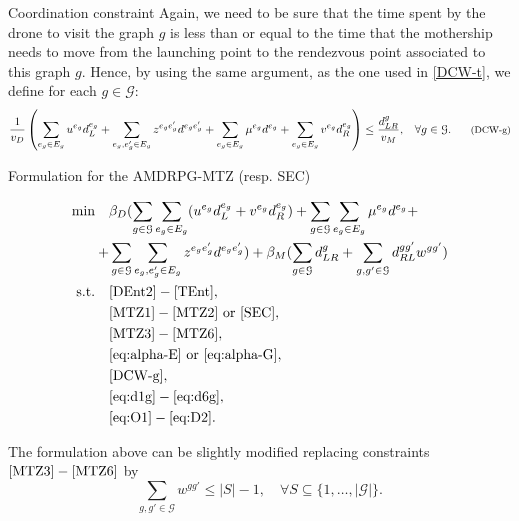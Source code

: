 \documentclass[slidestop,usepdftitle=false,10pt]{beamer}
\begin{document}
	\begin{frame}{Coordination constraint}
	    Again, we need to be sure that the time spent by the drone to visit the graph $g$ is less than or equal to the time that the mothership needs to move from the launching point to the rendezvous point associated to this graph $g$. Hence, by using the same argument, as the one used in \eqref{DCW-t}, we define for each $g\in \mathcal G$:
        \begin{equation}
        \footnotesize
         \frac{1}{v_D}\left(\sum_{e_g\in E_g} u^{e_g}d_L^{e_g} + \sum_{e_g, e^\prime_g\in E_g}z^{e_ge^\prime_g}d^{e_ge^\prime_g} + \sum_{e_g\in E_g} \mu^{e_g} d^{e_g} + \sum_{e_g\in E_g}v^{e_g}d_R^{e_g}\right)\leq \frac{d_{LR}^{g}}{v_M}, \quad\forall g\in\mathcal G.\label{DCW-g}\tag{DCW-g}
        \end{equation}

	\end{frame}
	
	\begin{frame}{Formulation for the AMDRPG-MTZ (resp. SEC)}
	\begin{footnotesize}
	\begin{align*}
	    \text{min}\quad &\beta_D(\sum_{g\in\mathcal G}\sum_{e_g\in E_g} (u^{e_g}d_L^{e_g} + v^{e_g}d_R^{e_g}) + \sum_{g\in\mathcal G}\sum_{e_g\in E_g} \mu^{e_g} d^{e_g} + \\
	    + & \sum_{g\in\mathcal G}\sum_{e_g,e^\prime_g\in E_g}z^{e_ge^\prime_g}d^{e_ge^\prime_g}) + \beta_M(\sum_{g\in\mathcal G} d_{LR}^g + \sum_{g,g'\in \mathcal G}d_{RL}^{gg'}w^{gg'}) \\
	    \text{s.t.}\quad & \eqref{DEnt2}-\eqref{TEnt}, \\
	    & \eqref{MTZ1} - \eqref{MTZ2} \text{ or } \eqref{SEC}, \\
	    & \eqref{MTZ3} - \eqref{MTZ6}, \\
	    & \eqref{eq:alpha-E} \text{ or } \eqref{eq:alpha-G}, \\
	    & \eqref{DCW-g}, \\
	    & \eqref{eq:d1g}-\eqref{eq:d6g}, \\
	    & \eqref{eq:O1}-\eqref{eq:D2}.
	\end{align*}
	\end{footnotesize}
	The formulation above can be slightly modified replacing constraints $\eqref{MTZ3} - \eqref{MTZ6}$ by
    \begin{equation}\label{SEC-graph}
    \sum_{g,g'\in \mathcal G} w^{gg'} \le |S|-1, \quad \forall S\subseteq \{1,\ldots, |\mathcal G|\}.
    \end{equation}

	\end{frame}
	
\end{document}
